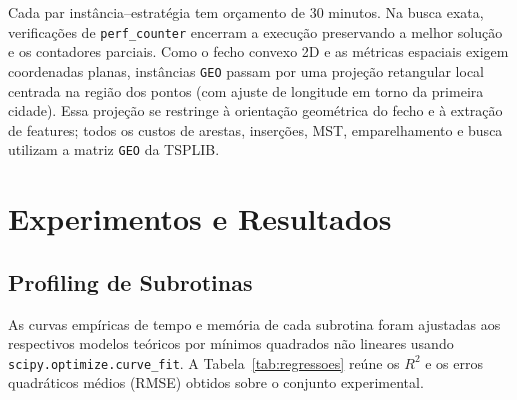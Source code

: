 \documentclass[12pt]{article}
\begin{document}
Cada par instância--estratégia tem orçamento de 30 minutos. Na busca exata, verificações de \texttt{perf\_counter} encerram a execução preservando a melhor solução e os contadores parciais. Como o fecho convexo 2D e as métricas espaciais exigem coordenadas planas, instâncias \texttt{GEO} passam por uma projeção retangular local centrada na região dos pontos (com ajuste de longitude em torno da primeira cidade). Essa projeção se restringe à orientação geométrica do fecho e à extração de features; todos os custos de arestas, inserções, MST, emparelhamento e busca utilizam a matriz \texttt{GEO} da TSPLIB.

\section{Experimentos e Resultados}

\subsection{Profiling de Subrotinas}

As curvas empíricas de tempo e memória de cada subrotina foram ajustadas aos respectivos modelos teóricos por mínimos quadrados não lineares usando \texttt{scipy.optimize.curve\_fit}. A Tabela~\ref{tab:regressoes} reúne os $R^2$ e os erros quadráticos médios (RMSE) obtidos sobre o conjunto experimental.
\end{document}
